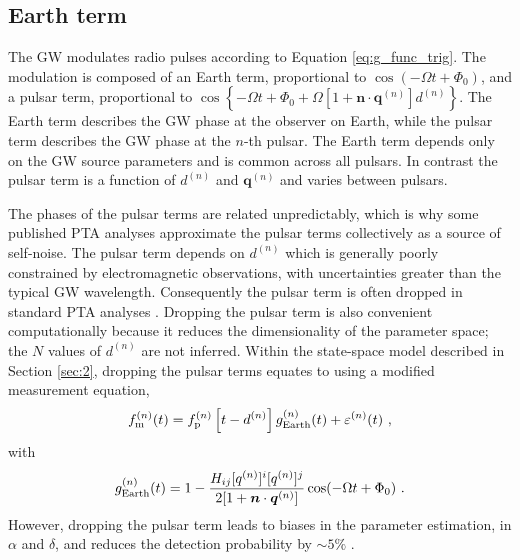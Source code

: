 \documentclass[fleqn,usenatbib,useAMS]{mnras}
\begin{document}
\subsection{Earth term}\label{sec:earth_term}
The GW modulates radio pulses according to Equation \eqref{eq:g_func_trig}. The modulation is composed of an Earth term, proportional to $\cos(-\Omega t + \Phi_0)$, and a pulsar term, proportional to $\cos \left \{-\Omega t +\Phi_0 + \Omega \left[1 + \boldsymbol{n}\cdot \boldsymbol{q}^{(n)} \right]  d^{(n)} \right \}$. The Earth term describes the GW phase at the observer on Earth, while the pulsar term describes the GW phase at the $n$-th pulsar. The Earth term depends only on the GW source parameters and is common across all pulsars. In contrast the pulsar term is a function of $d^{(n)}$ and $\boldsymbol{q}^{(n)}$ and varies between pulsars. \newline 



The phases of the pulsar terms are related unpredictably, which is why some published PTA analyses approximate the pulsar terms collectively as a source of self-noise. The pulsar term depends on $d^{(n)}$ which is generally poorly constrained by electromagnetic observations, with uncertainties greater than the typical GW wavelength. Consequently the pulsar term is often dropped in standard PTA analyses \citep[e.g.][]{Sesana2010,Babak2012,Petiteau2013,Zhu2015,Taylors2016,Goldstein2018,Charisi2023arXiv230403786C}. Dropping the pulsar term is also convenient computationally because it reduces the dimensionality of the parameter space; the $N$ values of $d^{(n)}$ are not inferred. Within the state-space model described in Section \ref{sec:2}, dropping the pulsar terms equates to using a modified measurement equation,
\begin{equation}
	f_{\rm m}^{(n)}(t) = f_{\rm p}^{(n)}\left [t-d^{(n)} \right ] g^{(n)}_{\rm Earth}(t) + \varepsilon^{(n)}(t) \ , 
	\label{eq:measuremen_earth}
\end{equation}
with
\begin{equation}
	g^{(n)}_{\rm Earth}(t) = 1 - \frac{ H_{ij}[q^{(n)}]^i [q^{(n)}]^j}{2[1 + \boldsymbol{n}\cdot \boldsymbol{q}^{(n)}] }  \cos(-\Omega t +\Phi_0)  \ .
	\label{eq:g_func_trig_earth}
\end{equation}
However, dropping the pulsar term leads to biases in the parameter estimation, in $\alpha$ and $\delta$, and reduces the detection probability by $\sim 5 \%$ \citep{Zhupulsarterms,Chen2022,KimpsonPTA}. 
\end{document}
